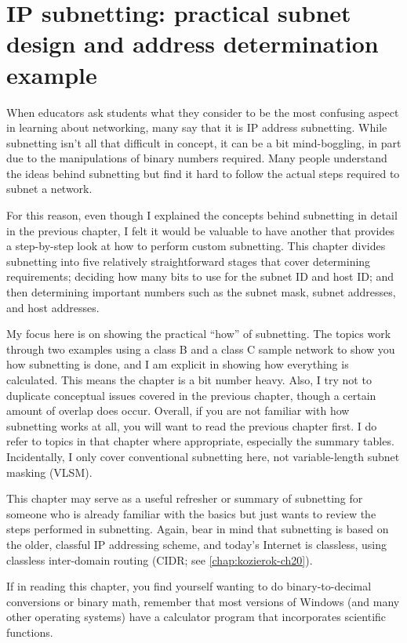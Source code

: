 \chapter[IP subnetting: examples]{IP subnetting: practical subnet design and address determination example}
\label{chap:kozierok-ch19}

When educators ask students what they consider to be the most confusing
aspect in learning about networking, many say that it is IP address
subnetting. While subnetting isn't all that difficult in concept, it can
be a bit mind-boggling, in part due to the manipulations of binary
numbers required. Many people understand the ideas behind subnetting but
find it hard to follow the actual steps required to subnet a network.

For this reason, even though I explained the concepts behind subnetting
in detail in the previous chapter, I felt it would be valuable to have
another that provides a step-by-step look at how to perform custom
subnetting. This chapter divides subnetting into five relatively
straightforward stages that cover determining requirements; deciding how
many bits to use for the subnet ID and host ID; and then determining
important numbers such as the subnet mask, subnet addresses, and host
addresses.

My focus here is on showing the practical ``how'' of subnetting.
The topics work through two examples using a class B and a class C sample network to show you how subnetting is
done, and I am explicit in showing how everything is calculated.
This means the chapter is a bit number heavy.
Also, I try not to duplicate conceptual issues covered in the previous chapter, though a certain amount of overlap does occur.
Overall, if you are not familiar with how subnetting works at all, you will want to read the previous chapter first.
I do refer to topics in that chapter where appropriate, especially the summary tables.
Incidentally, I only cover conventional subnetting here, not variable-length subnet masking (VLSM).

This chapter may serve as a useful refresher or summary of subnetting for someone who is already familiar with the basics but just wants to review the
steps performed in subnetting.
Again, bear in mind that subnetting is based on the older, classful IP addressing scheme, and today's Internet is classless, using classless inter-domain routing (CIDR; see \vref{chap:kozierok-ch20}).

\begin{note}
If in reading this chapter, you find yourself wanting to do binary-to-decimal conversions or binary math, remember that most
versions of Windows (and many other operating systems) have a calculator program that incorporates scientific functions.
\end{note}

